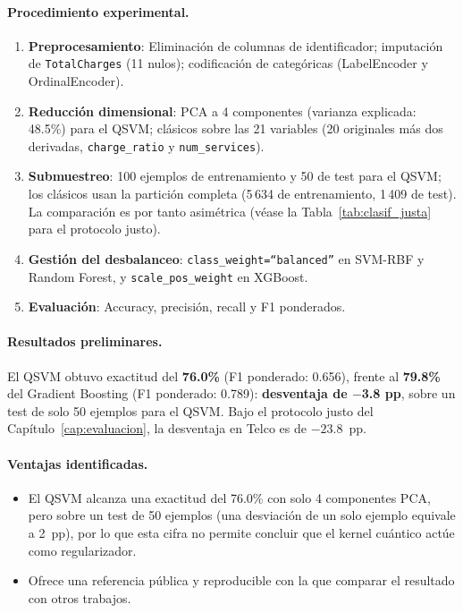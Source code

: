 \paragraph{Procedimiento experimental.}
\begin{enumerate}
  \item \textbf{Preprocesamiento}: Eliminación de columnas de identificador; imputación de \texttt{TotalCharges} (11 nulos); codificación de categóricas (LabelEncoder y OrdinalEncoder).
  \item \textbf{Reducción dimensional}: PCA a 4 componentes (varianza explicada: 48.5\%) para el QSVM; clásicos sobre las 21 variables (20 originales más dos derivadas, \texttt{charge\_ratio} y \texttt{num\_services}).
  \item \textbf{Submuestreo}: 100 ejemplos de entrenamiento y 50 de test para el QSVM; los clásicos usan la partición completa (5\,634 de entrenamiento, 1\,409 de test). La comparación es por tanto asimétrica (véase la Tabla~\ref{tab:clasif_justa} para el protocolo justo).
  \item \textbf{Gestión del desbalanceo}: \texttt{class\_weight=``balanced''} en SVM-RBF y Random Forest, y \texttt{scale\_pos\_weight} en XGBoost.
  \item \textbf{Evaluación}: Accuracy, precisión, recall y F1 ponderados.
\end{enumerate}

\paragraph{Resultados preliminares.}
El QSVM obtuvo exactitud del \textbf{76.0\%} (F1 ponderado: 0.656), frente al \textbf{79.8\%} del Gradient Boosting (F1 ponderado: 0.789): \textbf{desventaja de $-$3.8 pp}, sobre un test de solo 50 ejemplos para el QSVM. Bajo el protocolo justo del Capítulo~\ref{cap:evaluacion}, la desventaja en Telco es de $-23.8$~pp.

\paragraph{Ventajas identificadas.}
\begin{itemize}
  \item El QSVM alcanza una exactitud del 76.0\% con solo 4 componentes PCA, pero sobre un test de 50 ejemplos (una desviación de un solo ejemplo equivale a 2~pp), por lo que esta cifra no permite concluir que el kernel cuántico actúe como regularizador.
  \item Ofrece una referencia pública y reproducible con la que comparar el resultado con otros trabajos.
\end{itemize}

